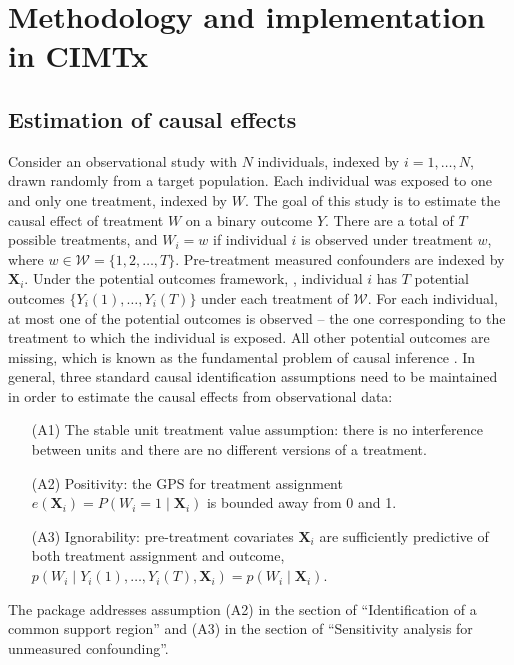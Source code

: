 \section{Methodology and implementation in CIMTx} \label{sec:causal_multiple}
\subsection{Estimation of causal effects} \label{sec:estimation}

Consider an observational study with $N$ individuals, indexed by $i =1, \ldots, N$, drawn randomly from a target population. Each individual was exposed to one and only one treatment, indexed by $W$. The goal of this study is to estimate the causal effect of treatment $W$ on a binary outcome $Y$. There are a total of $T$ possible treatments, and $W_i = w$ if individual $i$ is observed under treatment $w$, where $w \in \mathscr{W} = \{1, 2, \ldots, T\}$.  Pre-treatment measured confounders are indexed by $\bm{X}_i$. Under the potential outcomes framework,  \citep{rubin1974estimating, holland1986statistics}, individual $i$ has $T$ potential outcomes $\{Y_i(1), \ldots, Y_i(T)\}$ under each treatment of $\mathscr{W}$.  For each individual, at most one of the potential outcomes is observed -- the one corresponding to the treatment to which the individual is exposed. All other potential outcomes are missing, which is known as the fundamental problem of causal inference \citep{holland1986statistics}. In general,  three standard causal identification assumptions \citep{rubin1980randomization, hu2020estimation} need to be maintained in order to estimate the causal effects from observational data:  
\begin{enumerate}
    \item [(A1)] The stable unit treatment value assumption: there is no interference between units and there are no different versions of a treatment. 
    \item [(A2)] Positivity: the GPS for treatment assignment $e(\bm{X}_i)=P(W_i=1 \mid \bm{X}_i)$ is bounded away from 0 and 1. 
    \item [(A3)] Ignorability: pre-treatment covariates $\bm{X}_i$ are sufficiently predictive of both treatment assignment and outcome, $p(W_i \mid Y_i(1), \ldots, Y_i(T), \bm{X}_i) = p (W_i \mid \bm{X}_i)$.
\end{enumerate}
 The  package addresses assumption (A2) in the section of ``Identification of a common support region'' and (A3) in the section of ``Sensitivity analysis for unmeasured confounding''. 
 
